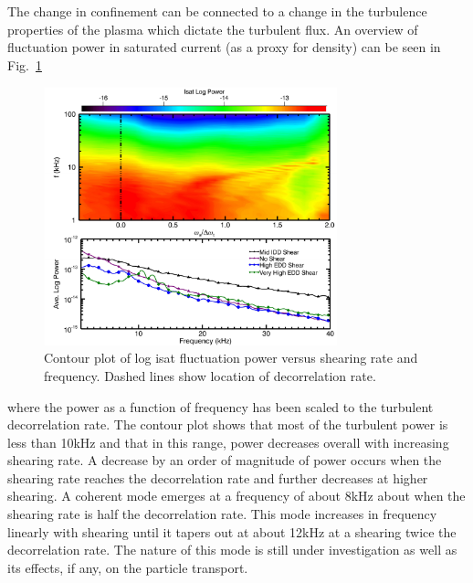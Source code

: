 \documentclass[%
 aps,
 prl,
 amsmath,amssymb,
 reprint,%
]{revtex4-1}
\begin{document}
The change in confinement can be connected to a change in the turbulence properties of the plasma which dictate the turbulent flux. An overview of fluctuation power in saturated current (as a proxy for density) can be seen in 
Fig.~\ref{fig:powercontour}
\begin{figure}
\begin{center}
\includegraphics[width=8.5cm]{powercontour.pdf}%
\end{center}
\caption{\label{fig:powercontour} Contour plot of log isat fluctuation power versus shearing rate and frequency. Dashed lines show location of decorrelation rate.}
\end{figure}
where the power as a function of frequency has been scaled to the turbulent decorrelation rate. The contour plot shows that most of the turbulent power is less than 10kHz and that in this range, power decreases overall with increasing shearing rate. A decrease by an order of magnitude of power occurs when the shearing rate reaches the decorrelation rate and further decreases at higher shearing. A coherent mode emerges at a frequency of about 8kHz about when the shearing rate is half the decorrelation rate. This mode increases in frequency linearly with shearing until it tapers out at about 12kHz at a shearing twice the decorrelation rate. The nature of this mode is still under investigation as well as its effects, if any, on the particle transport. 
\end{document}
